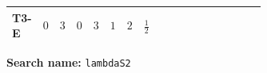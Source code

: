 \documentclass[8pt]{article}
\begin{document}
\begin{landscape}
\begin{longtable}{@{}llcccccc >{\raggedright\arraybackslash}p{0.21\linewidth} >{\raggedright\arraybackslash}p{0.21\linewidth} >{\raggedright\arraybackslash}p{0.21\linewidth}@{}}
\midrule
T3-E & $0$ & $3$ & $0$ & $3$ & $1$ & $2$ & $\frac{1}{2}$ & \scriptsize\adjustbox{max width=\linewidth}{$\begin{gathered} 21 {g_2}^4\end{gathered}$} & \scriptsize\adjustbox{max width=\linewidth}{$\begin{gathered} +{g_Y}^2 \left(12 {g_2}^2-12 {\lambda_{S_2}}-6 {\lambda_{S_2}^{\rm Adj}}\right)\end{gathered}$} & \scriptsize\adjustbox{max width=\linewidth}{$\begin{gathered} +{g_2}^2 (-24 {\lambda_{S_2}}-12 {\lambda_{S_2}^{\rm Adj}})\end{gathered}$} \\
\midrule
\bottomrule
\end{longtable}
\clearpage
\noindent\textbf{Search name: }\texttt{lambdaS2}\par\smallskip

\end{landscape}
\end{document}
